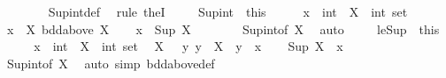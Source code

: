 \begin{isabellebody}
\ \ \ \ \ \ \isamarkupfalse%
\ Sup{\isacharunderscore}{\kern0pt}int{\isacharunderscore}{\kern0pt}def\ \isamarkupfalse%
\ {\isacharparenleft}{\kern0pt}rule\ theI{\isacharprime}{\kern0pt}{\isacharparenright}{\kern0pt}\ \isacommand{{\isacharbraceright}{\kern0pt}}\isamarkupfalse%
\isanewline
\ \ \isamarkupfalse%
\ Sup{\isacharunderscore}{\kern0pt}int\ {\isacharequal}{\kern0pt}\ this\isanewline
\isanewline
\ \ \isacommand{{\isacharbraceleft}{\kern0pt}}\isamarkupfalse%
\ \isamarkupfalse%
\ x\ {\isacharcolon}{\kern0pt}{\isacharcolon}{\kern0pt}\ int\ \ X\ {\isacharcolon}{\kern0pt}{\isacharcolon}{\kern0pt}\ {\isachardoublequoteopen}int\ set{\isachardoublequoteclose}\ \isamarkupfalse%
\ {\isachardoublequoteopen}x\ {\isasymin}\ X{\isachardoublequoteclose}\ {\isachardoublequoteopen}bdd{\isacharunderscore}{\kern0pt}above\ X{\isachardoublequoteclose}\ \isamarkupfalse%
\ \isamarkupfalse%
\ {\isachardoublequoteopen}x\ {\isasymle}\ Sup\ X{\isachardoublequoteclose}\isanewline
\ \ \ \ \ \ \isamarkupfalse%
\ Sup{\isacharunderscore}{\kern0pt}int{\isacharbrackleft}{\kern0pt}of\ X{\isacharbrackright}{\kern0pt}\ \isamarkupfalse%
\ auto\ \isacommand{{\isacharbraceright}{\kern0pt}}\isamarkupfalse%
\isanewline
\ \ \isamarkupfalse%
\ le{\isacharunderscore}{\kern0pt}Sup\ {\isacharequal}{\kern0pt}\ this\isanewline
\ \ \isacommand{{\isacharbraceleft}{\kern0pt}}\isamarkupfalse%
\ \isamarkupfalse%
\ x\ {\isacharcolon}{\kern0pt}{\isacharcolon}{\kern0pt}\ int\ \ X\ {\isacharcolon}{\kern0pt}{\isacharcolon}{\kern0pt}\ {\isachardoublequoteopen}int\ set{\isachardoublequoteclose}\ \isamarkupfalse%
\ {\isachardoublequoteopen}X\ {\isasymnoteq}\ {\isacharbraceleft}{\kern0pt}{\isacharbraceright}{\kern0pt}{\isachardoublequoteclose}\ {\isachardoublequoteopen}{\isasymAnd}y{\isachardot}{\kern0pt}\ y\ {\isasymin}\ X\ {\isasymLongrightarrow}\ y\ {\isasymle}\ x{\isachardoublequoteclose}\ \isamarkupfalse%
\ \isamarkupfalse%
\ {\isachardoublequoteopen}Sup\ X\ {\isasymle}\ x{\isachardoublequoteclose}\isanewline
\ \ \ \ \ \ \isamarkupfalse%
\ Sup{\isacharunderscore}{\kern0pt}int{\isacharbrackleft}{\kern0pt}of\ X{\isacharbrackright}{\kern0pt}\ \isamarkupfalse%
\ {\isacharparenleft}{\kern0pt}auto\ simp{\isacharcolon}{\kern0pt}\ bdd{\isacharunderscore}{\kern0pt}above{\isacharunderscore}{\kern0pt}def{\isacharparenright}{\kern0pt}\ \isacommand{{\isacharbraceright}{\kern0pt}}\isamarkupfalse%

\end{isabellebody}
